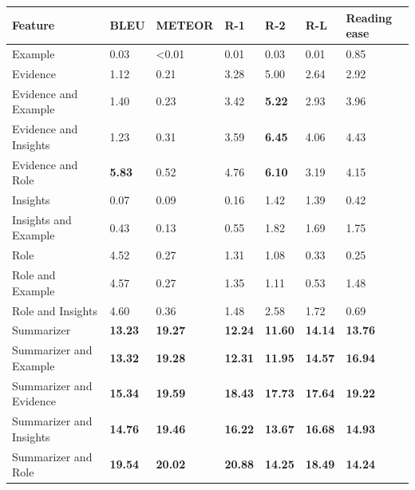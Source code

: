 \begin{tabular}{|l|l|l|l|l|l|l|}
\hline
\textbf{Feature} & BLEU & METEOR & R-1 & R-2 & R-L & Reading ease \\
 \hline
 Example & 0.03 & \textless{}0.01 & 0.01 & 0.03 & 0.01 & 0.85 \\
 \hline
 Evidence & 1.12 & 0.21 & 3.28 & 5.00 & 2.64 & 2.92 \\
 \hline
 Evidence and Example & 1.40 & 0.23 & 3.42 & \textbf{5.22} & 2.93 & 3.96 \\
 \hline
 Evidence and Insights & 1.23 & 0.31 & 3.59 & \textbf{6.45} & 4.06 & 4.43 \\
 \hline
 Evidence and Role & \textbf{5.83} & 0.52 & 4.76 & \textbf{6.10} & 3.19 & 4.15 \\
 \hline
 Insights & 0.07 & 0.09 & 0.16 & 1.42 & 1.39 & 0.42 \\
 \hline
 Insights and Example & 0.43 & 0.13 & 0.55 & 1.82 & 1.69 & 1.75 \\
 \hline
 Role & 4.52 & 0.27 & 1.31 & 1.08 & 0.33 & 0.25 \\
 \hline
 Role and Example & 4.57 & 0.27 & 1.35 & 1.11 & 0.53 & 1.48 \\
 \hline
 Role and Insights & 4.60 & 0.36 & 1.48 & 2.58 & 1.72 & 0.69 \\
 \hline
 Summarizer & \textbf{13.23} & \textbf{19.27} & \textbf{12.24} & \textbf{11.60} & \textbf{14.14} & \textbf{13.76} \\
 \hline
 Summarizer and Example & \textbf{13.32} & \textbf{19.28} & \textbf{12.31} & \textbf{11.95} & \textbf{14.57} & \textbf{16.94} \\
 \hline
 Summarizer and Evidence & \textbf{15.34} & \textbf{19.59} & \textbf{18.43} & \textbf{17.73} & \textbf{17.64} & \textbf{19.22} \\
 \hline
 Summarizer and Insights & \textbf{14.76} & \textbf{19.46} & \textbf{16.22} & \textbf{13.67} & \textbf{16.68} & \textbf{14.93} \\
 \hline
 Summarizer and Role & \textbf{19.54} & \textbf{20.02} & \textbf{20.88} & \textbf{14.25} & \textbf{18.49} & \textbf{14.24} \\
\hline
\end{tabular}
